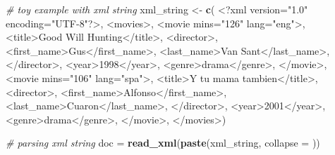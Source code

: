 \documentclass[
]{book}
\newenvironment{Shaded}{\begin{snugshade}}{\end{snugshade}}
\newcommand{\AttributeTok}[1]{\textcolor[rgb]{0.13,0.29,0.53}{#1}}
\newcommand{\CommentTok}[1]{\textcolor[rgb]{0.56,0.35,0.01}{\textit{#1}}}
\newcommand{\FunctionTok}[1]{\textcolor[rgb]{0.13,0.29,0.53}{\textbf{#1}}}
\newcommand{\NormalTok}[1]{#1}
\newcommand{\OtherTok}[1]{\textcolor[rgb]{0.56,0.35,0.01}{#1}}
\newcommand{\StringTok}[1]{\textcolor[rgb]{0.31,0.60,0.02}{#1}}
\begin{document}
\begin{Shaded}
\begin{Highlighting}[]
\CommentTok{\# toy example with xml string}
\NormalTok{xml\_string }\OtherTok{\textless{}{-}} \FunctionTok{c}\NormalTok{(}
  \StringTok{\textquotesingle{}\textless{}?xml version="1.0" encoding="UTF{-}8"?\textgreater{}\textquotesingle{}}\NormalTok{,}
  \StringTok{\textquotesingle{}\textless{}movies\textgreater{}\textquotesingle{}}\NormalTok{,}
  \StringTok{\textquotesingle{}\textless{}movie mins="126" lang="eng"\textgreater{}\textquotesingle{}}\NormalTok{,}
  \StringTok{\textquotesingle{}\textless{}title\textgreater{}Good Will Hunting\textless{}/title\textgreater{}\textquotesingle{}}\NormalTok{,}
  \StringTok{\textquotesingle{}\textless{}director\textgreater{}\textquotesingle{}}\NormalTok{,}
  \StringTok{\textquotesingle{}\textless{}first\_name\textgreater{}Gus\textless{}/first\_name\textgreater{}\textquotesingle{}}\NormalTok{,}
  \StringTok{\textquotesingle{}\textless{}last\_name\textgreater{}Van Sant\textless{}/last\_name\textgreater{}\textquotesingle{}}\NormalTok{,}
  \StringTok{\textquotesingle{}\textless{}/director\textgreater{}\textquotesingle{}}\NormalTok{,}
  \StringTok{\textquotesingle{}\textless{}year\textgreater{}1998\textless{}/year\textgreater{}\textquotesingle{}}\NormalTok{,}
  \StringTok{\textquotesingle{}\textless{}genre\textgreater{}drama\textless{}/genre\textgreater{}\textquotesingle{}}\NormalTok{,}
  \StringTok{\textquotesingle{}\textless{}/movie\textgreater{}\textquotesingle{}}\NormalTok{,}
  \StringTok{\textquotesingle{}\textless{}movie mins="106" lang="spa"\textgreater{}\textquotesingle{}}\NormalTok{,}
  \StringTok{\textquotesingle{}\textless{}title\textgreater{}Y tu mama tambien\textless{}/title\textgreater{}\textquotesingle{}}\NormalTok{,}
  \StringTok{\textquotesingle{}\textless{}director\textgreater{}\textquotesingle{}}\NormalTok{,}
  \StringTok{\textquotesingle{}\textless{}first\_name\textgreater{}Alfonso\textless{}/first\_name\textgreater{}\textquotesingle{}}\NormalTok{,}
  \StringTok{\textquotesingle{}\textless{}last\_name\textgreater{}Cuaron\textless{}/last\_name\textgreater{}\textquotesingle{}}\NormalTok{,}
  \StringTok{\textquotesingle{}\textless{}/director\textgreater{}\textquotesingle{}}\NormalTok{,}
  \StringTok{\textquotesingle{}\textless{}year\textgreater{}2001\textless{}/year\textgreater{}\textquotesingle{}}\NormalTok{,}
  \StringTok{\textquotesingle{}\textless{}genre\textgreater{}drama\textless{}/genre\textgreater{}\textquotesingle{}}\NormalTok{,}
  \StringTok{\textquotesingle{}\textless{}/movie\textgreater{}\textquotesingle{}}\NormalTok{,}
  \StringTok{\textquotesingle{}\textless{}/movies\textgreater{}\textquotesingle{}}\NormalTok{)}

\CommentTok{\# parsing xml string}
\NormalTok{doc }\OtherTok{=} \FunctionTok{read\_xml}\NormalTok{(}\FunctionTok{paste}\NormalTok{(xml\_string, }\AttributeTok{collapse =} \StringTok{\textquotesingle{}\textquotesingle{}}\NormalTok{))}
\end{Highlighting}
\end{Shaded}
\end{document}
